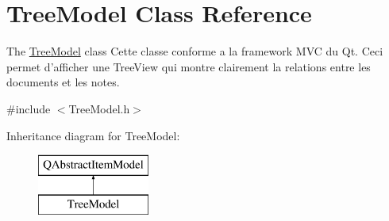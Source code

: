 \hypertarget{class_tree_model}{\section{Tree\-Model Class Reference}
\label{class_tree_model}
}


The \hyperlink{class_tree_model}{Tree\-Model} class Cette classe conforme a la framework M\-V\-C du Qt. Ceci permet d'afficher une Tree\-View qui montre clairement la relations entre les documents et les notes.  




{\ttfamily \#include $<$Tree\-Model.\-h$>$}

Inheritance diagram for Tree\-Model\-:\begin{figure}[H]
\begin{center}
\leavevmode
\includegraphics[height=2.000000cm]{class_tree_model}
\end{center}
\end{figure}
